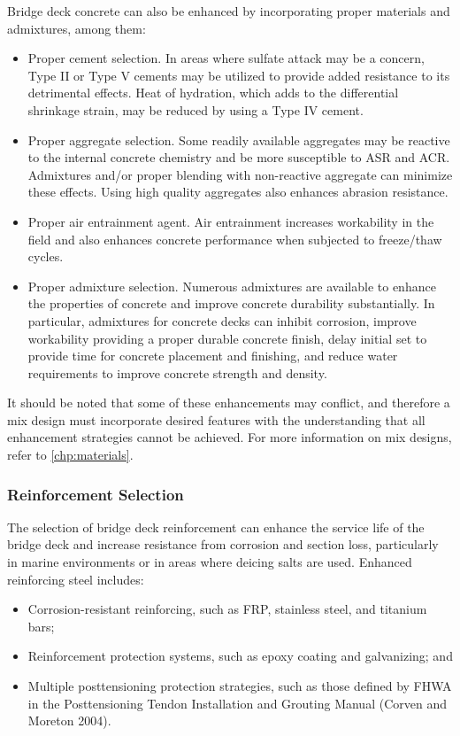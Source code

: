 Bridge deck concrete can also be enhanced by incorporating proper materials and admixtures, among them:
\begin{itemize}
  \item Proper cement selection. In areas where sulfate attack may be a concern, Type II or Type V cements may be
  utilized to provide added resistance to its detrimental effects. Heat of hydration, which adds to the
  differential shrinkage strain, may be reduced by using a Type IV cement.
  \item Proper aggregate selection. Some readily available aggregates may be reactive to the internal concrete
  chemistry and be more susceptible to ASR and ACR. Admixtures and/or proper blending with non-reactive
  aggregate can minimize these effects. Using high quality aggregates also enhances abrasion resistance.
  \item Proper air entrainment agent. Air entrainment increases workability in the field and also enhances concrete
  performance when subjected to freeze/thaw cycles.
  \item Proper admixture selection. Numerous admixtures are available to enhance the properties of concrete and
  improve concrete durability substantially. In particular, admixtures for concrete decks can inhibit corrosion,
  improve workability providing a proper durable concrete finish, delay initial set to provide time for concrete
  placement and finishing, and reduce water requirements to improve concrete strength and density.
\end{itemize}

It should be noted that some of these enhancements may conflict, and therefore a mix design must incorporate
desired features with the understanding that all enhancement strategies cannot be achieved. For more information on
mix designs, refer to \cref{chp:materials}.

\subsubsection{Reinforcement Selection}
The selection of bridge deck reinforcement can enhance the service life of the bridge deck and increase resistance
from corrosion and section loss, particularly in marine environments or in areas where deicing salts are used.
Enhanced reinforcing steel includes:
\begin{itemize}
  \item Corrosion-resistant reinforcing, such as FRP, stainless steel, and titanium bars;
  \item Reinforcement protection systems, such as epoxy coating and galvanizing; and
  \item Multiple posttensioning protection strategies, such as those defined by FHWA in the Posttensioning Tendon
  Installation and Grouting Manual (Corven and Moreton 2004).
\end{itemize}

